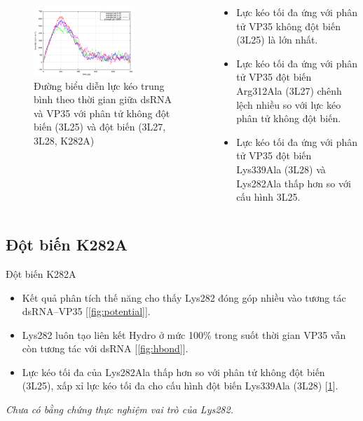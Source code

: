 \documentclass[10pt]{beamer}
\begin{document}
	\begin{frame}
	\begin{columns}
	\begin{column}{0.5\textwidth}
		\begin{figure}[t]
		\includegraphics[width=0.7\textwidth,natwidth=610,natheight=642]{../pullf}
		\caption{Đường biểu diễn lực kéo trung bình theo thời gian giữa dsRNA và VP35 với phân tử không đột biến (3L25) và đột biến (3L27, 3L28, K282A)}
		\label{fig:pullf}
		\end{figure}
	\end{column}
	
	\begin{column}{0.5\textwidth}
	\begin{itemize}
	\item Lực kéo tối đa ứng với phân tử VP35 không đột biến (3L25) là lớn nhất.
	\item Lực kéo tối đa ứng với phân tử VP35 đột biến Arg312Ala (3L27) chênh lệch nhiều so với lực kéo phân tử không đột biến.
	\item Lực kéo tối đa ứng với phân tử VP35 đột biến Lys339Ala (3L28) và Lys282Ala thấp hơn so với cấu hình 3L25.
	\end{itemize}
	\end{column}
	\end{columns}
	\end{frame}


\subsection{Đột biến K282A}
	\begin{frame}{Đột biến K282A}
	\begin{itemize}
	\item Kết quả phân tích thế năng cho thấy Lys282 đóng góp nhiều vào tương tác dsRNA--VP35 [\ref{fig:potential}].
	\item Lys282 luôn tạo liên kết Hydro ở mức 100\% trong suốt thời gian VP35 vẫn còn tương tác với dsRNA [\ref{fig:hbond}].
	\item Lực kéo tối đa của Lys282Ala thấp hơn so với phân tử không đột biến (3L25), xấp xỉ lực kéo tối đa cho cấu hình đột biến Lys339Ala (3L28) [\ref{fig:pullf}].
	\end{itemize}
	\emph{Chưa có bằng chứng thực nghiệm vai trò của Lys282.}
	\end{frame}
	
\end{document}

